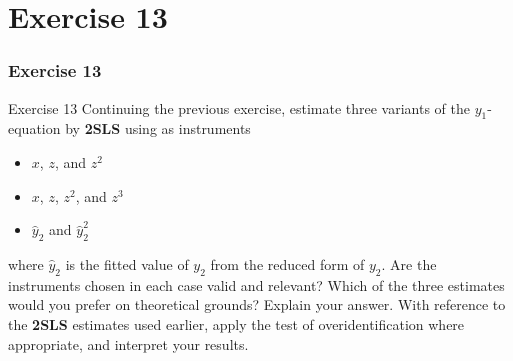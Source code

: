 \documentclass[10pt, aspectratio=169]{beamer}
\begin{document}
	\section{Exercise 13}
		\begin{frame}
			\frametitle{Exercise 13}
			\begin{block}{Exercise 13}
				Continuing the previous exercise, estimate three variants of the $y_{1}$-equation
				by \textbf{2SLS} using as instruments
					\begin{itemize}
						\item[i)] $x$, $z$, and $z^{2}$ 
						\item[ii)] $x$, $z$, $z^{2}$, and $z^{3}$ 
						\item[iii)] $\hat{y}_{2}$ and $\hat{y}_{2}^{2}$
					\end{itemize}
				where $\hat{y}_{2}$ is the fitted value of $y_{2}$ from the reduced form of $y_{2}$. Are the
				instruments chosen in each case valid and relevant? Which of the three
				estimates would you prefer on theoretical grounds? Explain your answer.
				With reference to the \textbf{2SLS} estimates used earlier, apply the test of
				overidentification where appropriate, and interpret your results.
			\end{block}
		\end{frame}
\end{document}
